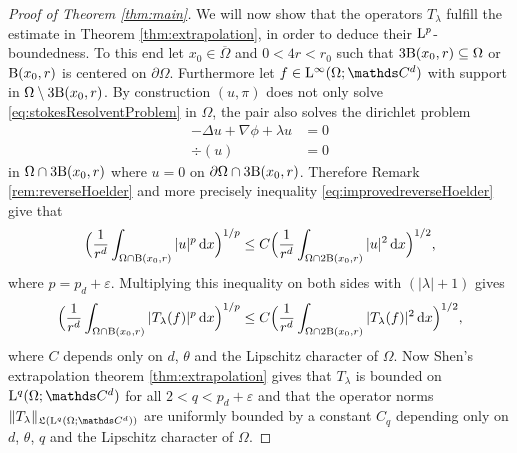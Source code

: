 \begin{proof}[Proof of Theorem \ref{thm:main}]
  We will now show that the operators $T_\lambda$ fulfill the estimate in Theorem \ref{thm:extrapolation}, in order to deduce their $\mathrm{L}^p$-boundedness.
  To this end let $x_0 \in \overline \Omega$ and $0 < 4r < r_0$ such that $3 \mathrm{B}(x_0, r) \subseteq \Omega$ or $\mathrm{B}(x_0, r)$ is centered on $\partial\Omega$.
  Furthermore let $f \in \Ell^\infty(\Omega; \C^d)$ with support in $\Omega \setminus 3 \mathrm{B}(x_0, r)$.
  By construction $(u,\pi)$ does not only solve \eqref{eq:stokesResolventProblem} in $\Omega$, the pair also solves the dirichlet problem
  \begin{align*}
    -\Delta u + \nabla \phi + \lambda u &= 0 \\
    \div(u)&= 0
  \end{align*}
  in $\Omega \cap 3 \mathrm{B}(x_0, r)$ where $u = 0$ on $\partial\Omega \cap 3 \mathrm{B}(x_0, r)$.
  Therefore Remark \ref{rem:reverseHoelder} and more precisely inequality \eqref{eq:improvedreverseHoelder} give that
  \begin{align*}
    \Big( \frac{1}{r^d} \int_{\Omega \cap \mathrm{B}(x_0, r)} |u|^p \, {\operatorname{d}\!{x}} \Big)^{1/p} \leq C \Big( \frac{1}{r^d} \int_{\Omega \cap 2 \mathrm{B}(x_0, r)} |u|^2 \, {\operatorname{d}\!{x}} \Big)^{1/2},
  \end{align*}
  where $p = p_d + \varepsilon$.
  Multiplying this inequality on both sides with $(|\lambda| + 1)$ gives
  \begin{align}
    \label{eq:tlambdaEstimate}
    \Big( \frac{1}{r^d} \int_{\Omega \cap \mathrm{B}(x_0, r)} |T_\lambda(f)|^p \, {\operatorname{d}\!{x}} \Big)^{1/p} \leq C \Big( \frac{1}{r^d} \int_{\Omega \cap 2 \mathrm{B}(x_0, r)} |T_\lambda(f)|^2 \, {\operatorname{d}\!{x}} \Big)^{1/2},
  \end{align}
  where $C$ depends only on $d$, $\theta$ and the Lipschitz character of $\Omega$.
  Now Shen's extrapolation theorem \ref{thm:extrapolation} gives that $T_\lambda$ is bounded on $\Ell^q(\Omega; \C^d)$ for all $2 < q < p_d + \varepsilon$ and that the operator norms $\|T_\lambda\|_{\Li(\Ell^q(\Omega; \C^d))}$ are uniformly bounded by a constant $C_q$ depending only on $d$, $\theta$, $q$ and the Lipschitz character of $\Omega$.


\end{proof}
